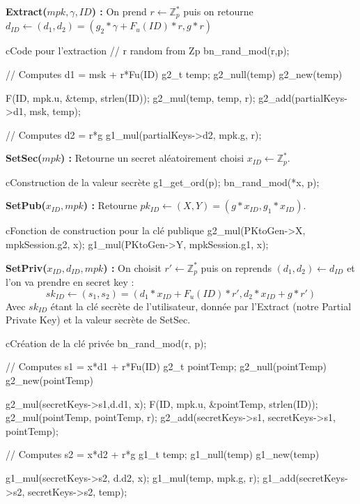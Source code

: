 \textbf{Extract($mpk, \gamma, ID$) :} On prend $r \leftarrow \mathbb{Z}_p^*$ puis on retourne $d_{ID} \leftarrow (d_1, d_2) = (g_2*\gamma + F_u(ID)*r, g*r)$\\
\begin{sourcebox}{c}{Code pour l'extraction}
	// r random from Zp
	bn_rand_mod(r,p);
	
	// Computes d1 = msk + r*Fu(ID)
	g2_t temp;
	g2_null(temp)
	g2_new(temp)
	
	F(ID, mpk.u, &temp, strlen(ID));
	g2_mul(temp, temp, r);
	g2_add(partialKeys->d1, msk, temp);
	
	// Computes d2 = r*g
	g1_mul(partialKeys->d2, mpk.g, r);
\end{sourcebox}
\textbf{SetSec($mpk$) :} Retourne un secret aléatoirement choisi $x_{ID} \leftarrow \mathbb{Z}_p^*$.\\
\begin{sourcebox}{c}{Construction de la valeur secrète}
	g1_get_ord(p);
	bn_rand_mod(*x, p);
\end{sourcebox}
\textbf{SetPub($x_{ID}, mpk$) :} Retourne $pk_{ID} \leftarrow (X,Y) = (g*x_{ID}, g_1*x_{ID})$.\\
\begin{sourcebox}{c}{Fonction de construction pour la clé publique}
	g2_mul(PKtoGen->X, mpkSession.g2, x);
	g1_mul(PKtoGen->Y, mpkSession.g1, x);
\end{sourcebox}
\textbf{SetPriv($x_{ID}, d_{ID}, mpk$) :} On choisit $r' \leftarrow \mathbb{Z}_p^*$ puis on reprends $(d_1, d_2) \leftarrow d_{ID}$ et l'on va prendre en secret key : 
\[sk_{ID} \leftarrow (s_1, s_2) = (d_1*x_{ID} + F_u(ID)*r', d_2*x_{ID} + g*r')\]
Avec $sk_{ID}$ étant la clé secrète de l'utilisateur, donnée par l'Extract (notre Partial Private Key) et la valeur secrète de SetSec.\\
\begin{sourcebox}{c}{Création de la clé privée}
	bn_rand_mod(r, p);
	
	// Computes s1 = x*d1 + r*Fu(ID)
	g2_t pointTemp;
	g2_null(pointTemp)
	g2_new(pointTemp)
	
	g2_mul(secretKeys->s1,d.d1, x);
	F(ID, mpk.u, &pointTemp, strlen(ID));
	g2_mul(pointTemp, pointTemp, r);
	g2_add(secretKeys->s1, secretKeys->s1, pointTemp);
	
	// Computes s2 = x*d2 + r*g
	g1_t temp;
	g1_null(temp)
	g1_new(temp)
	
	g1_mul(secretKeys->s2, d.d2, x);
	g1_mul(temp, mpk.g, r);
	g1_add(secretKeys->s2, secretKeys->s2, temp);
\end{sourcebox}
